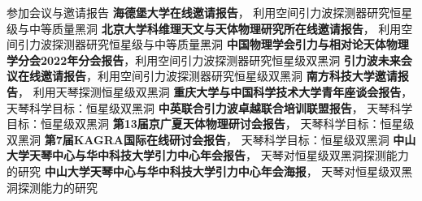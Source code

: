 
\begin{rubric}{参加会议与邀请报告}
    \entry*[2023] \textbf{海德堡大学在线邀请报告}， 利用空间引力波探测器研究恒星级与中等质量黑洞
    \entry*[2023] \textbf{北京大学科维理天文与天体物理研究所在线邀请报告}， 利用空间引力波探测器研究恒星级与中等质量黑洞
    \entry*[2022] \textbf{中国物理学会引力与相对论天体物理学分会2022年分会报告}，利用空间引力波探测器研究恒星级双黑洞
    \entry*[2022] \textbf{引力波未来会议在线邀请报告}，利用空间引力波探测器研究恒星级双黑洞
    \entry*[2022] \textbf{南方科技大学邀请报告}， 利用天琴探测恒星级双黑洞 
    \entry*[2021] \textbf{重庆大学与中国科学技术大学青年座谈会报告}， 天琴科学目标：恒星级双黑洞
    \entry*[2021] \textbf{中英联合引力波卓越联合培训联盟报告}， 天琴科学目标：恒星级双黑洞
    \entry*[2020] \textbf{第13届京广夏天体物理研讨会报告}， 天琴科学目标：恒星级双黑洞
    \entry*[2020] \textbf{第7届KAGRA国际在线研讨会报告}， 天琴科学目标：恒星级双黑洞
    \entry*[2019] \textbf{中山大学天琴中心与华中科技大学引力中心年会报告}， 天琴对恒星级双黑洞探测能力的研究 
    \entry*[2018] \textbf{中山大学天琴中心与华中科技大学引力中心年会海报}， 天琴对恒星级双黑洞探测能力的研究
\end{rubric}
